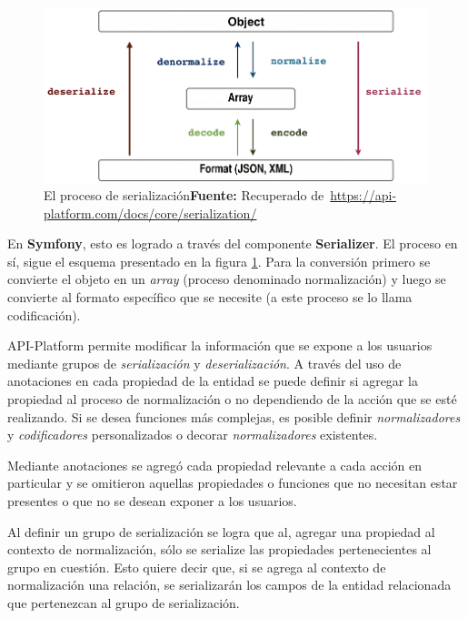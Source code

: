 \begin{figure}[H]
    \includegraphics[width=1\linewidth]{image/serializationWorkflow.png}
    \caption{El proceso de serialización\newline \textbf{Fuente:} Recuperado de~\url{https://api-platform.com/docs/core/serialization/}}
    \label{fig:image/serializationWorkflow}
\end{figure}

En \textbf{Symfony}, esto es logrado a través del componente \textbf{Serializer}. El proceso en sí, sigue el esquema presentado en la figura
\ref{fig:image/serializationWorkflow}\@.
Para la conversión primero se convierte el objeto en un \textit{array} (proceso denominado
normalización) y luego se convierte al formato específico que se necesite (a este proceso se lo llama codificación).

API-Platform permite modificar la información que se expone a los usuarios mediante grupos de \textit{serialización} y \textit{deserialización}\@. A través del uso de anotaciones
en cada propiedad de la entidad se puede definir si agregar la propiedad al proceso de normalización o no dependiendo de la acción que se esté realizando.
Si se desea funciones más complejas, es posible definir \textit{normalizadores} y \textit{codificadores} personalizados o decorar \textit{normalizadores} existentes.
~\parencite{api-platform-serialization}


Mediante anotaciones se agregó cada propiedad relevante a cada acción en particular y se omitieron aquellas propiedades o funciones que no necesitan estar
presentes o que no se desean exponer a los usuarios.

Al definir un grupo de serialización se logra que al, agregar una propiedad al contexto de normalización, sólo se serialize las propiedades pertenecientes al grupo en cuestión. Esto quiere decir que, si
se agrega al contexto de normalización una relación, se serializarán los campos de la entidad relacionada que pertenezcan al grupo de serialización.

